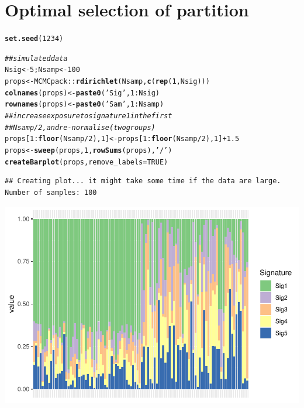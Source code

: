 \documentclass{article}\usepackage[]{graphicx}\usepackage[]{color}
\makeatletter
\def\maxwidth{ %
  \ifdim\Gin@nat@width>\linewidth
    \linewidth
  \else
    \Gin@nat@width
  \fi
}
\newcommand{\hlnum}[1]{\textcolor[rgb]{0.686,0.059,0.569}{#1}}%
\newcommand{\hlstr}[1]{\textcolor[rgb]{0.192,0.494,0.8}{#1}}%
\newcommand{\hlcom}[1]{\textcolor[rgb]{0.678,0.584,0.686}{\textit{#1}}}%
\newcommand{\hlopt}[1]{\textcolor[rgb]{0,0,0}{#1}}%
\newcommand{\hlstd}[1]{\textcolor[rgb]{0.345,0.345,0.345}{#1}}%
\newcommand{\hlkwb}[1]{\textcolor[rgb]{0.69,0.353,0.396}{#1}}%
\newcommand{\hlkwc}[1]{\textcolor[rgb]{0.333,0.667,0.333}{#1}}%
\newcommand{\hlkwd}[1]{\textcolor[rgb]{0.737,0.353,0.396}{\textbf{#1}}}%
\newenvironment{kframe}{%
 \def\at@end@of@kframe{}%
 \ifinner\ifhmode%
  \def\at@end@of@kframe{\end{minipage}}%
  \begin{minipage}{\columnwidth}%
 \fi\fi%
 \def\FrameCommand##1{\hskip\@totalleftmargin \hskip-\fboxsep
 \colorbox{shadecolor}{##1}\hskip-\fboxsep
     \hskip-\linewidth \hskip-\@totalleftmargin \hskip\columnwidth}%
 \MakeFramed {\advance\hsize-\width
   \@totalleftmargin\z@ \linewidth\hsize
   \@setminipage}}%
 {\par\unskip\endMakeFramed%
 \at@end@of@kframe}
\newenvironment{knitrout}{}{} %
\makeatother
\begin{document}
\section{Optimal selection of partition}

\begin{knitrout}
\color{fgcolor}\begin{kframe}
\begin{alltt}
\hlkwd{set.seed}\hlstd{(}\hlnum{1234}\hlstd{)}

\hlcom{## simulated data}
\hlstd{Nsig} \hlkwb{<-} \hlnum{5}\hlstd{; Nsamp} \hlkwb{<-} \hlnum{100}
\hlstd{props} \hlkwb{<-} \hlstd{MCMCpack}\hlopt{::}\hlkwd{rdirichlet}\hlstd{(Nsamp,} \hlkwd{c}\hlstd{(}\hlkwd{rep}\hlstd{(}\hlnum{1}\hlstd{,Nsig)))}
\hlkwd{colnames}\hlstd{(props)} \hlkwb{<-} \hlkwd{paste0}\hlstd{(}\hlstr{'Sig'}\hlstd{,} \hlnum{1}\hlopt{:}\hlstd{Nsig)}
\hlkwd{rownames}\hlstd{(props)} \hlkwb{<-} \hlkwd{paste0}\hlstd{(}\hlstr{'Sam '}\hlstd{,} \hlnum{1}\hlopt{:}\hlstd{Nsamp)}
\hlcom{## increase exposure to signature 1 in the first}
\hlcom{## Nsamp/2, and re-normalise (two groups)}
\hlstd{props[}\hlnum{1}\hlopt{:}\hlkwd{floor}\hlstd{(Nsamp}\hlopt{/}\hlnum{2}\hlstd{),} \hlnum{1}\hlstd{]} \hlkwb{<-} \hlstd{props[}\hlnum{1}\hlopt{:}\hlkwd{floor}\hlstd{(Nsamp}\hlopt{/}\hlnum{2}\hlstd{),} \hlnum{1}\hlstd{]} \hlopt{+} \hlnum{1.5}
\hlstd{props} \hlkwb{<-} \hlkwd{sweep}\hlstd{(props,} \hlnum{1}\hlstd{,} \hlkwd{rowSums}\hlstd{(props),} \hlstr{'/'}\hlstd{)}
\hlkwd{createBarplot}\hlstd{(props,} \hlkwc{remove_labels} \hlstd{=} \hlnum{TRUE}\hlstd{)}
\end{alltt}
\begin{verbatim}
## Creating plot... it might take some time if the data are large. Number of samples: 100
\end{verbatim}
\end{kframe}
\includegraphics[width=\maxwidth]{figure/unnamed-chunk-16-1} 

\end{knitrout}
\end{document}
